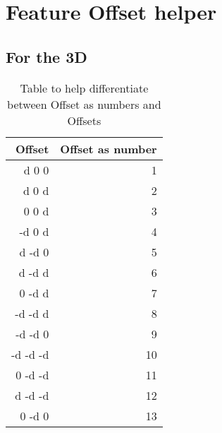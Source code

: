 \chapter{Feature Offset helper}

\section{For the 3D}

\begin{table}[H]
  \centering
    \begin{tabular}{|r|r|}
    \hline
    Offset & Offset as number \\ \hline
    d 0 0 & 1 \\ \hline
    d 0 d & 2 \\ \hline
    0 0 d & 3 \\ \hline
    -d 0 d & 4 \\ \hline
    d -d 0 & 5 \\ \hline
    d -d d & 6 \\ \hline
    0 -d d & 7 \\ \hline
    -d -d d & 8 \\ \hline
    -d -d 0 & 9 \\ \hline
    -d -d -d & 10 \\ \hline
    0 -d -d & 11 \\ \hline
    d -d -d & 12 \\ \hline
    0 -d 0 & 13 \\ \hline
    \end{tabular}%
  \caption{Table to help differentiate between Offset as numbers and Offsets}\label{tab:addlabel}%
\end{table}%
